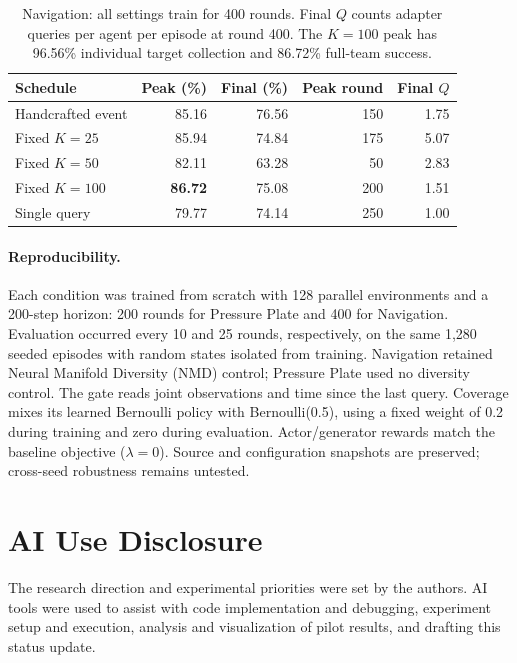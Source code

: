 \documentclass{article}
\begin{document}
\begin{table}[ht]
\centering
\small
\setlength{\tabcolsep}{5pt}
\caption{Navigation: all settings train for 400 rounds. Final $Q$ counts adapter queries per agent per episode at round 400. The $K=100$ peak has 96.56\% individual target collection and 86.72\% full-team success.}
\label{tab:nav}
\begin{tabular}{lrrrr}
\toprule
Schedule & Peak (\%) & Final (\%) & Peak round & Final $Q$ \\
\midrule
Handcrafted event & 85.16 & 76.56 & 150 & 1.75 \\
Fixed $K=25$      & 85.94 & 74.84 & 175 & 5.07 \\
Fixed $K=50$      & 82.11 & 63.28 & 50  & 2.83 \\
Fixed $K=100$     & \textbf{86.72} & 75.08 & 200 & 1.51 \\
Single query      & 79.77 & 74.14 & 250 & 1.00 \\
\bottomrule
\end{tabular}
\end{table}

\paragraph{Reproducibility.}
Each condition was trained from scratch with 128 parallel environments and a 200-step horizon: 200 rounds for Pressure Plate and 400 for Navigation. Evaluation occurred every 10 and 25 rounds, respectively, on the same 1,280 seeded episodes with random states isolated from training. Navigation retained Neural Manifold Diversity (NMD) control; Pressure Plate used no diversity control. The gate reads joint observations and time since the last query. Coverage mixes its learned Bernoulli policy with Bernoulli(0.5), using a fixed weight of 0.2 during training and zero during evaluation. Actor/generator rewards match the baseline objective ($\lambda=0$). Source and configuration snapshots are preserved; cross-seed robustness remains untested.

\section{AI Use Disclosure}
\label{app:ai-disclosure}

The research direction and experimental priorities were set by the authors. AI tools were used to assist with code implementation and debugging, experiment setup and execution, analysis and visualization of pilot results, and drafting this status update.
\end{document}
